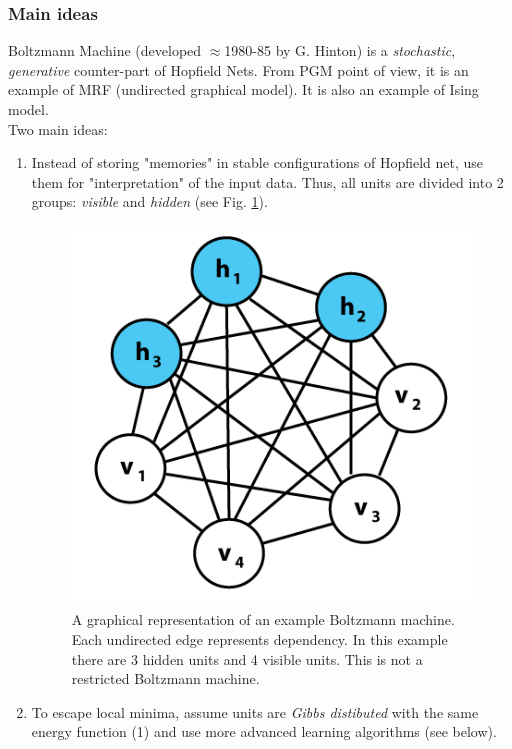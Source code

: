 \subsubsection{Main ideas}
Boltzmann Machine (developed $\approx$1980-85 by G. Hinton) is a \emph{stochastic}, \emph{generative} counter-part of Hopfield Nets. From PGM point of view, it is an example of MRF (undirected graphical model). It is also an example of Ising model.
\\[1em]
Two main ideas:
\begin{enumerate}
\item Instead of storing "memories" in stable configurations of Hopfield net, use them for "interpretation" of the input data. Thus, all units are divided into 2 groups: \emph{visible} and \emph{hidden} (see Fig. \ref{fig:bm}).
\begin{figure}[h]
\begin{mdframed}
\includegraphics[scale=0.4]{img/bm.png}
\centering
\caption{A graphical representation of an example Boltzmann machine. Each undirected edge represents dependency. In this example there are 3 hidden units and 4 visible units. This is not a restricted Boltzmann machine.}
\label{fig:bm}
\end{mdframed}
\end{figure}

\item To escape local minima, assume units are \emph{Gibbs distibuted} with the same energy function (1) and use more advanced learning algorithms (see below).
\end{enumerate}

